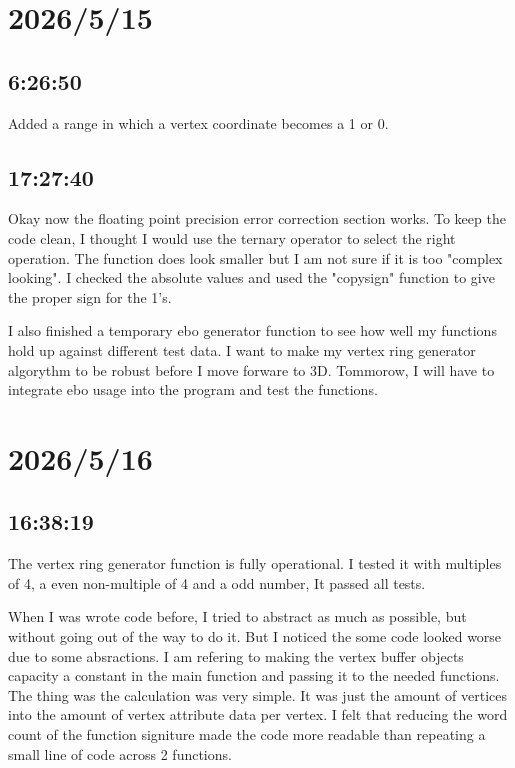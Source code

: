 \documentclass{article}
\begin{document}
\section*{2026/5/15}
\subsection*{6:26:50}
Added a range in which a vertex coordinate becomes a 1 or 0.

\subsection*{17:27:40}
Okay now the floating point precision error correction section works. To keep the code clean, I thought
I would use the ternary operator to select the right operation. The function does look smaller but 
I am not sure if it is too "complex looking". I checked the absolute values and used the "copysign"
function to give the proper sign for the 1's.

I also finished a temporary ebo generator function to see how well my functions hold up against different
test data. I want to make my vertex ring generator algorythm to be robust before I move forware to 3D.
Tommorow, I will have to integrate ebo usage into the program and test the functions.

\section*{2026/5/16}
\subsection*{16:38:19}
The vertex ring generator function is fully operational. I tested it with multiples of 4, a even 
non-multiple of 4 and a odd number, It passed all tests. 

When I was wrote code before, I tried to abstract as much as possible, but without going out of the way to
do it. But I noticed the some code looked worse due to some absractions. I am refering to making the vertex
buffer objects capacity a constant in the main function and passing it to the needed functions. The thing was
the calculation was very simple. It was just the amount of vertices into the amount of vertex attribute data
per vertex. I felt that reducing the word count of the function signiture made the code more readable than
repeating a small line of code across 2 functions.
\end{document}
